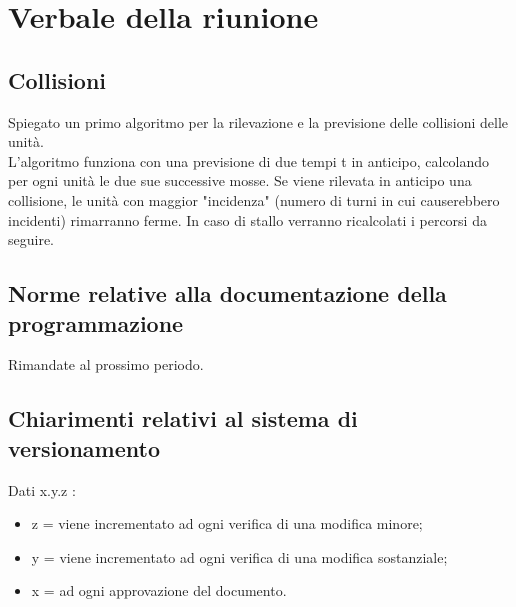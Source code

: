 \section{Verbale della riunione}

\subsection{Collisioni}
Spiegato un primo algoritmo per la rilevazione e la previsione delle collisioni delle unità.\\
L'algoritmo funziona con una previsione di due tempi t in anticipo, calcolando per ogni unità le due sue successive mosse. Se viene rilevata in anticipo una collisione, le unità con maggior "incidenza" (numero di turni in cui causerebbero incidenti) rimarranno ferme. In caso di stallo verranno ricalcolati i percorsi da seguire.

\subsection{Norme relative alla documentazione della programmazione}
Rimandate al prossimo periodo.

\subsection{Chiarimenti relativi al sistema di versionamento}
Dati x.y.z :
\begin{itemize}
	\item z = viene incrementato ad ogni verifica di una modifica minore;
	\item y = viene incrementato ad ogni verifica di una modifica sostanziale;
	\item x = ad ogni approvazione del documento.
\end{itemize}

